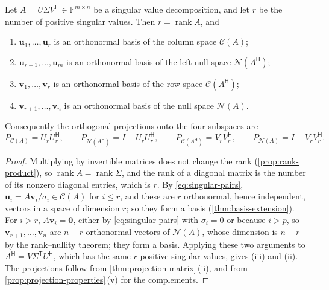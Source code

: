 \begin{theorem}
\label{thm:svd-subspaces}
Let $A=U\Sigma V^{\mathsf H}\in\mathbb F^{m\times n}$ be a singular value decomposition, and let $r$ be the number of positive singular values. Then $r=\operatorname{rank}A$, and
\begin{enumerate}
\item $\mathbf u_1,\ldots,\mathbf u_r$ is an orthonormal basis of the column space $\mathcal C(A)$;
\item $\mathbf u_{r+1},\ldots,\mathbf u_m$ is an orthonormal basis of the left null space $\mathcal N(A^{\mathsf H})$;
\item $\mathbf v_1,\ldots,\mathbf v_r$ is an orthonormal basis of the row space $\mathcal C(A^{\mathsf H})$;
\item $\mathbf v_{r+1},\ldots,\mathbf v_n$ is an orthonormal basis of the null space $\mathcal N(A)$.
\end{enumerate}
Consequently the orthogonal projections onto the four subspaces are
\[
P_{\mathcal C(A)}=U_rU_r^{\mathsf H},\qquad P_{\mathcal N(A^{\mathsf H})}=I-U_rU_r^{\mathsf H},\qquad P_{\mathcal C(A^{\mathsf H})}=V_rV_r^{\mathsf H},\qquad P_{\mathcal N(A)}=I-V_rV_r^{\mathsf H}.
\]
\end{theorem}

\begin{proof}
Multiplying by invertible matrices does not change the rank (\cref{prop:rank-product}), so $\operatorname{rank}A=\operatorname{rank}\Sigma$, and the rank of a diagonal matrix is the number of its nonzero diagonal entries, which is $r$. By \eqref{eq:singular-pairs}, $\mathbf u_i=A\mathbf v_i/\sigma_i\in\mathcal C(A)$ for $i\le r$, and these are $r$ orthonormal, hence independent, vectors in a space of dimension $r$; so they form a basis (\cref{thm:basis-extension}). For $i>r$, $A\mathbf v_i=\mathbf 0$, either by \eqref{eq:singular-pairs} with $\sigma_i=0$ or because $i>p$, so $\mathbf v_{r+1},\ldots,\mathbf v_n$ are $n-r$ orthonormal vectors of $\mathcal N(A)$, whose dimension is $n-r$ by the rank--nullity theorem; they form a basis. Applying these two arguments to $A^{\mathsf H}=V\Sigma^{\mathsf T}U^{\mathsf H}$, which has the same $r$ positive singular values, gives (iii) and (ii). The projections follow from \cref{thm:projection-matrix}\,(ii), and from \cref{prop:projection-properties}\,(v) for the complements.
\end{proof}

